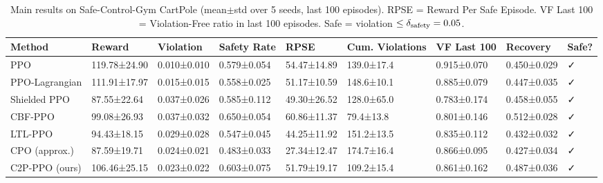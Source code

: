 \begin{table}
\caption{Main results on Safe-Control-Gym CartPole (mean$\pm$std over 5 seeds, last 100 episodes). RPSE = Reward Per Safe Episode. VF Last 100 = Violation-Free ratio in last 100 episodes. Safe = violation $\leq\delta_{\rm safety}=0.05$.}
\label{tab:main_results}
\begin{tabular}{lllllllll}
\toprule
Method & Reward & Violation & Safety Rate & RPSE & Cum. Violations & VF Last 100 & Recovery & Safe? \\
\midrule
PPO & 119.78±24.90 & 0.010±0.010 & 0.579±0.054 & 54.47±14.89 & 139.0±17.4 & 0.915±0.070 & 0.450±0.029 & ✓ \\
PPO-Lagrangian & 111.91±17.97 & 0.015±0.015 & 0.558±0.025 & 51.17±10.59 & 148.6±10.1 & 0.885±0.079 & 0.447±0.035 & ✓ \\
Shielded PPO & 87.55±22.64 & 0.037±0.026 & 0.585±0.112 & 49.30±26.52 & 128.0±65.0 & 0.783±0.174 & 0.458±0.055 & ✓ \\
CBF-PPO & 99.08±26.93 & 0.037±0.032 & 0.650±0.054 & 60.86±11.37 & 79.4±13.8 & 0.801±0.146 & 0.512±0.028 & ✓ \\
LTL-PPO & 94.43±18.15 & 0.029±0.028 & 0.547±0.045 & 44.25±11.92 & 151.2±13.5 & 0.835±0.112 & 0.432±0.032 & ✓ \\
CPO (approx.) & 87.59±19.71 & 0.024±0.021 & 0.483±0.033 & 27.34±12.47 & 174.7±16.4 & 0.866±0.095 & 0.427±0.034 & ✓ \\
C2P-PPO (ours) & 106.46±25.15 & 0.023±0.022 & 0.603±0.075 & 51.79±19.17 & 109.2±15.4 & 0.861±0.162 & 0.487±0.036 & ✓ \\
\bottomrule
\end{tabular}
\end{table}
